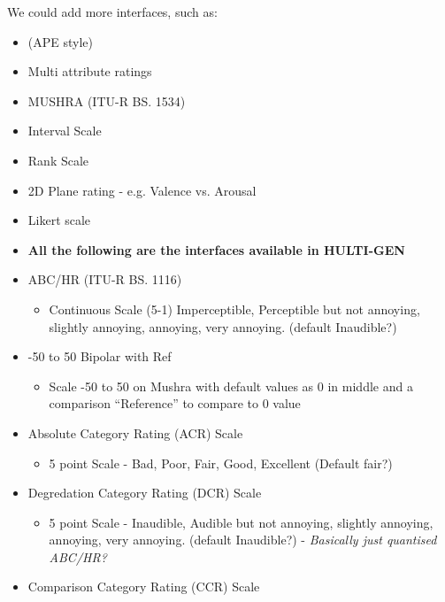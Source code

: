 \documentclass{sig-alternate}
\begin{document}
	We could add more interfaces, such as: 
	\begin{itemize}
		\item (APE style) \cite{ape}
		\item Multi attribute ratings
		\item MUSHRA (ITU-R BS. 1534)~\cite{recommendation20031534}
		\item Interval Scale~\cite{zacharov1999round}
		\item Rank Scale~\cite{pascoe1983evaluation}
		
		\item 2D Plane rating - e.g. Valence vs. Arousal~\cite{carroll1969individual}
		\item Likert scale~\cite{likert1932technique}
		
		\item {\bf All the following are the interfaces available in HULTI-GEN~\cite{hultigen} }
		\item ABC/HR (ITU-R BS. 1116)~\cite{recommendation19971116}
		\begin{itemize}
			\item Continuous Scale (5-1) Imperceptible, Perceptible but not annoying, slightly annoying, annoying, very annoying. (default Inaudible?)
		\end{itemize}
		\item -50 to 50 Bipolar with Ref
		\begin{itemize}
			\item Scale -50 to 50 on Mushra with default values as 0 in middle and a comparison ``Reference'' to compare to 0 value
		\end{itemize}
		\item Absolute Category Rating (ACR) Scale~\cite{rec1996p}
		\begin{itemize}
			\item 5 point Scale - Bad, Poor, Fair, Good, Excellent (Default fair?)
		\end{itemize}
		\item Degredation Category Rating (DCR) Scale~\cite{rec1996p}
		\begin{itemize}
			\item 5 point Scale - Inaudible, Audible but not annoying, slightly annoying, annoying, very annoying. (default Inaudible?) - {\it Basically just quantised ABC/HR?}
		\end{itemize}
		\item Comparison Category Rating (CCR) Scale~\cite{rec1996p}
		\begin{itemize}

\end{itemize}
\end{itemize}
\end{document}
